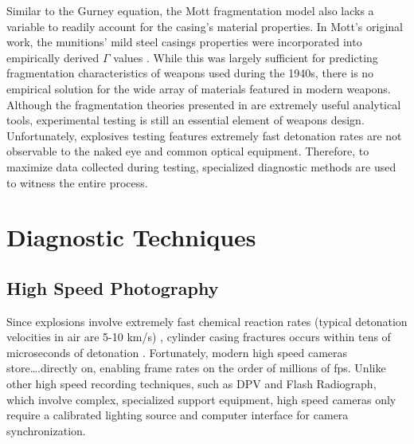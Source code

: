 Similar to the Gurney equation, the Mott fragmentation model also lacks a variable to readily account for the casing's material properties. 
 In Mott's original work, the munitions' mild steel casings properties were incorporated into empirically derived $\Gamma$ values \cite{Mott_Fragmentation_DOE}. While this was largely sufficient for predicting fragmentation characteristics of weapons used during the 1940s, there is no empirical solution for the wide array of materials featured in modern weapons.
 Although the fragmentation theories presented in  are extremely useful analytical tools, experimental testing is still an essential element of weapons design. Unfortunately, explosives testing features extremely fast detonation rates are not observable to the naked eye and common optical equipment. Therefore, to maximize data collected during testing, specialized diagnostic methods are used to witness the entire process.   

\section{Diagnostic Techniques} \label{sec:2_Diagnostic_Techniques}


\subsection{High Speed Photography} \label{sec:2_Diagnostic_Photography}

Since explosions involve extremely fast chemical reaction rates (typical detonation velocities in air are 5-10 km/s) \cite{Cooper1996}, cylinder casing fractures occurs within tens of microseconds of detonation \cite{ExpandingFractureBehavior1045Cylinder}.
Fortunately, modern high speed cameras store….directly on, enabling frame rates on the order of millions of \gls{fps}. Unlike other high speed recording techniques, such as \gls{DPV} and Flash Radiograph, which involve complex, specialized support equipment, high speed cameras only require a calibrated lighting source and computer interface for camera synchronization.   

